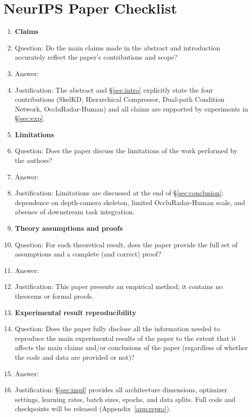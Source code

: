 \section*{NeurIPS Paper Checklist}

\begin{enumerate}

\item {\bf Claims}
    \item[] Question: Do the main claims made in the abstract and introduction accurately reflect the paper's contributions and scope?
    \item[] Answer: \answerYes{}
    \item[] Justification: The abstract and \S\ref{sec:intro} explicitly state the four contributions (SkelKD, Hierarchical Compressor, Dual-path Condition Network, OccluRadar-Human) and all claims are supported by experiments in \S\ref{sec:exp}.

\item {\bf Limitations}
    \item[] Question: Does the paper discuss the limitations of the work performed by the authors?
    \item[] Answer: \answerYes{}
    \item[] Justification: Limitations are discussed at the end of \S\ref{sec:conclusion}: dependence on depth-camera skeleton, limited OccluRadar-Human scale, and absence of downstream task integration.

\item {\bf Theory assumptions and proofs}
    \item[] Question: For each theoretical result, does the paper provide the full set of assumptions and a complete (and correct) proof?
    \item[] Answer: \answerNA{}
    \item[] Justification: This paper presents an empirical method; it contains no theorems or formal proofs.

\item {\bf Experimental result reproducibility}
    \item[] Question: Does the paper fully disclose all the information needed to reproduce the main experimental results of the paper to the extent that it affects the main claims and/or conclusions of the paper (regardless of whether the code and data are provided or not)?
    \item[] Answer: \answerYes{}
    \item[] Justification: \S\ref{sec:impl} provides all architecture dimensions, optimizer settings, learning rates, batch sizes, epochs, and data splits. Full code and checkpoints will be released (Appendix~\ref{app:repro}).


\end{enumerate}

